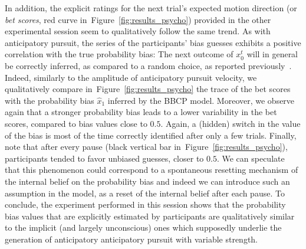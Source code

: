 \documentclass[10pt,letterpaper]{article}
\newcommand{\citep}[1]{\cite{#1}}
\newcommand{\seeFig}[1]{Figure~\ref{fig:#1}}
\begin{document}
In addition, the explicit ratings
for the next trial's expected motion direction (or \textit{bet scores}, red curve in~\seeFig{results_psycho})
provided in the other experimental session
seem to qualitatively follow the same trend.
 As with anticipatory pursuit, the series of the participants' bias guesses
exhibits a positive correlation with the true probability bias:
The next outcome of $x_{0}^{t}$ will in general be correctly inferred,
as compared to a random choice, as reported previously~\citep{Meyniel15}.
Indeed, similarly to the amplitude of anticipatory pursuit velocity,
we qualitatively compare in~\seeFig{results_psycho}
the trace of the bet scores
with the probability bias $\hat{x}_1$ inferred by the BBCP model.
Moreover, we observe again that a stronger probability bias leads
to a lower variability in the bet scores, compared to bias values close to $0.5$.
Again, a (hidden) switch in the value of the bias is
most of the time correctly identified after only a few trials.
Finally, note that after every pause (black vertical bar in~\seeFig{results_psycho}),
participants tended to favor unbiased guesses, closer to $0.5$.
We can speculate that this phenomenon could correspond
to a spontaneous resetting mechanism of the internal belief on the probability bias
and indeed we can introduce such an assumption in the model,
as a reset of the internal belief after each pause.
To conclude, the experiment performed in this session
shows that the probability bias values that are explicitly estimated by participants
are qualitatively similar to the implicit (and largely unconscious) ones
which supposedly underlie the generation of anticipatory anticipatory pursuit with variable strength.
\end{document}
